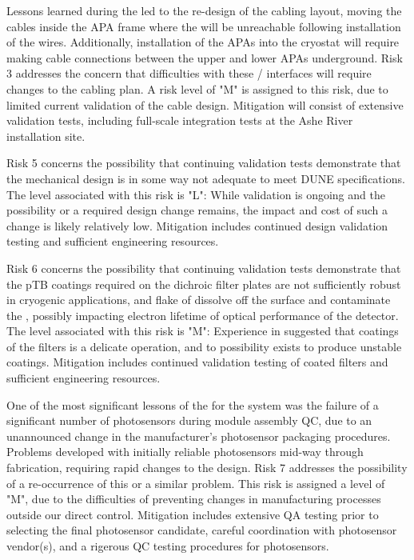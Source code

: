Lessons learned during the  led to the re-design of the  cabling layout, moving the cables inside the APA frame where the will be unreachable following installation of the  wires.  Additionally, installation of the APAs into the cryostat will require making  cable connections between the upper and lower APAs underground.  Risk 3 addresses the concern that difficulties with these / interfaces will require changes to the cabling plan.  A risk level of "M" is assigned to this risk, due to limited current validation of the cable design.  Mitigation will consist of extensive validation tests, including full-scale integration tests at the Ashe River installation site.

Risk 5 concerns the possibility that continuing validation tests demonstrate that the  mechanical design is in some way not adequate to meet DUNE specifications.  The level associated with this risk is "L":  While validation is ongoing and the possibility or a required design change remains, the impact and cost of such a change is likely relatively low.  Mitigation includes continued design validation testing and sufficient engineering resources.

Risk 6 concerns the possibility that continuing validation tests demonstrate that the pTB coatings required on the dichroic filter plates are not sufficiently robust in cryogenic applications, and flake of dissolve off the surface and contaminate the , possibly impacting electron lifetime of optical performance of the detector.  The level associated with this risk is "M":  Experience in  suggested that coatings of the filters is a delicate operation, and to possibility exists to produce unstable coatings.  Mitigation includes continued validation testing of coated filters and sufficient engineering resources.

One of the most significant lessons of the  for the  system was the failure of a significant number of photosensors during module assembly QC, due to an unannounced change in the manufacturer's photosensor packaging procedures.  Problems developed with initially reliable photosensors mid-way through fabrication, requiring rapid changes to the  design.  Risk 7 addresses the possibility of a re-occurrence of this or a similar problem.  This risk is assigned a level of "M", due to the difficulties of preventing changes in manufacturing processes outside our direct control.  Mitigation includes extensive QA testing prior to selecting the final photosensor candidate, careful coordination with photosensor vendor(s), and a rigerous QC testing procedures for photosensors.

